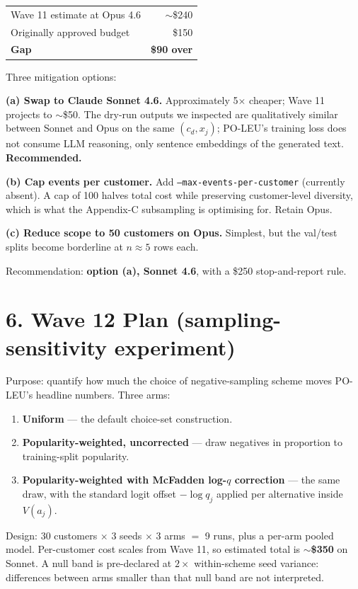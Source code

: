 \documentclass[11pt]{article}
\begin{document}
\begin{center}
\begin{tabular}{lr}
\toprule
Wave 11 estimate at Opus 4.6 & $\sim$\$240 \\
Originally approved budget & \$150 \\
\textbf{Gap} & \textbf{\$90 over} \\
\bottomrule
\end{tabular}
\end{center}

Three mitigation options:

\textbf{(a) Swap to Claude Sonnet 4.6.} Approximately 5$\times$ cheaper; Wave 11 projects to $\sim$\$50. The dry-run outputs we inspected are qualitatively similar between Sonnet and Opus on the same $(c_d, x_j)$; PO-LEU's training loss does not consume LLM reasoning, only sentence embeddings of the generated text. \textbf{Recommended.}

\textbf{(b) Cap events per customer.} Add \texttt{--max-events-per-customer} (currently absent). A cap of 100 halves total cost while preserving customer-level diversity, which is what the Appendix-C subsampling is optimising for. Retain Opus.

\textbf{(c) Reduce scope to 50 customers on Opus.} Simplest, but the val/test splits become borderline at $n\approx 5$ rows each.

Recommendation: \textbf{option (a), Sonnet 4.6}, with a \$250 stop-and-report rule.

\section*{6. Wave 12 Plan (sampling-sensitivity experiment)}

Purpose: quantify how much the choice of negative-sampling scheme moves PO-LEU's headline numbers. Three arms:

\begin{enumerate}
\item \textbf{Uniform} --- the default choice-set construction.
\item \textbf{Popularity-weighted, uncorrected} --- draw negatives in proportion to training-split popularity.
\item \textbf{Popularity-weighted with McFadden log-$q$ correction} --- the same draw, with the standard logit offset $-\log q_j$ applied per alternative inside $V(a_j)$.
\end{enumerate}

Design: 30 customers $\times$ 3 seeds $\times$ 3 arms $=$ 9 runs, plus a per-arm pooled model. Per-customer cost scales from Wave 11, so estimated total is \textbf{$\sim$\$350} on Sonnet. A null band is pre-declared at $2\times$ within-scheme seed variance: differences between arms smaller than that null band are not interpreted.
\end{document}
